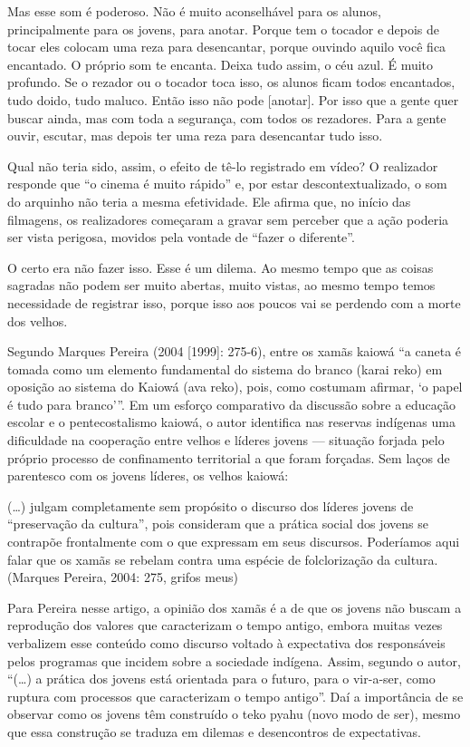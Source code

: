 {{Mas esse som é poderoso. Não é muito aconselhável para os alunos,
principalmente para os jovens, para anotar. Porque tem o tocador e
depois de tocar eles colocam uma reza para desencantar, porque ouvindo
aquilo você fica encantado. O próprio som te encanta. Deixa tudo assim,
o céu azul. É muito profundo. Se o rezador ou o tocador toca isso, os
alunos ficam todos encantados, tudo doido, tudo maluco. Então isso não
pode [anotar]. Por isso que a gente quer buscar ainda, mas com toda a
segurança, com todos os rezadores. Para a gente ouvir, escutar, mas
depois ter uma reza para desencantar tudo isso.

Qual não teria sido, assim, o efeito de tê-lo registrado em vídeo? O
realizador responde que ``o cinema é muito rápido'' e, por estar
descontextualizado, o som do arquinho não teria a mesma efetividade.
Ele afirma que, no início das filmagens, os realizadores começaram a
gravar sem perceber que a ação poderia ser vista perigosa, movidos pela
vontade de ``fazer o diferente''.

O certo era não fazer isso. Esse é um dilema. Ao mesmo tempo que as
coisas sagradas não podem ser muito abertas, muito vistas, ao mesmo
tempo temos necessidade de registrar isso, porque isso aos poucos vai
se perdendo com a morte dos velhos.

Segundo Marques Pereira (2004 [1999]: 275-6), entre os xamãs kaiowá ``a
caneta é tomada como um elemento fundamental do sistema do branco
(karai reko) em oposição ao sistema do Kaiowá (ava reko), pois, como
costumam afirmar, ‘o papel é tudo para branco’''. Em um esforço
comparativo da discussão sobre a educação escolar e o pentecostalismo
kaiowá, o autor identifica nas reservas indígenas uma dificuldade na
cooperação entre velhos e líderes jovens --- situação forjada pelo
próprio processo de confinamento territorial a que foram forçadas. Sem
laços de parentesco com os jovens líderes, os velhos kaiowá:

(\ldots{}) julgam completamente sem propósito o discurso dos líderes jovens
de ``preservação da cultura'', pois
consideram que a prática social dos jovens se contrapõe frontalmente
com o que expressam em seus discursos. Poderíamos aqui falar que os
xamãs se rebelam contra uma espécie de folclorização da cultura.
(Marques Pereira, 2004:  275, grifos meus)

Para Pereira nesse artigo, a opinião dos xamãs é a de que os jovens não
buscam a reprodução dos valores que caracterizam o tempo antigo, embora
muitas vezes verbalizem esse conteúdo como discurso voltado à
expectativa dos responsáveis pelos programas que incidem sobre a
sociedade indígena. Assim, segundo o autor, ``(\ldots{}) a prática dos jovens
está orientada para o futuro, para o vir-a-ser, como ruptura com
processos que caracterizam o tempo antigo''. Daí a importância de se
observar como os jovens têm construído o teko pyahu (novo modo de ser),
mesmo que essa construção se traduza em dilemas e desencontros de
expectativas.

}}
